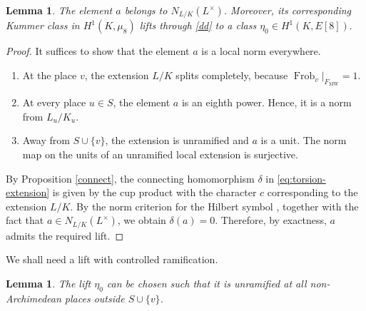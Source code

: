 \documentclass[11pt,a4paper]{amsart}
\newtheorem{lemma}[theorem]{Lemma}
\theoremstyle{definition}
\numberwithin{equation}{section}
\begin{document}
\begin{lemma}\label{lem:a-norm}
The element $a$ belongs to $N_{L/K}(L^\times)$.  Moreover, its corresponding Kummer
class in $H^1(K,\mu_8)$ lifts through \eqref{dd} to a
class
$
 \eta_0\in H^1(K,E[8]).
$
\end{lemma}

\begin{proof}
It suffices to show that the element $a$ is a local norm everywhere.
\begin{enumerate}
	\item At the place $v$, the extension $L/K$ splits completely,
	because
$
	\operatorname{Frob}_{v}|_{F_{\mathrm{MW}}}=1.
$
	
	\item At every place $u\in S$, the element $a$ is an eighth power.
	Hence, it is a norm from $L_u/K_u$.
	
	\item Away from
	$S\cup\{v\}$, the extension is unramified and $a$ is a unit.
	The norm map on the units of an unramified local extension is
	surjective.
\end{enumerate}

By Proposition \ref{connect}, the connecting homomorphism $\delta$ in \eqref{eq:torsion-extension} is given by the cup product with the
character $c$ corresponding to the extension $L/K$. By the norm
criterion for the Hilbert symbol \cite[Chapter XIV, Corollary 1]{Serre}, together with the fact
that $a\in N_{L/K}(L^\times)$, we obtain $\delta(a)=0$. Therefore, by exactness, $a$ admits the required lift.
\end{proof}

We shall need a lift with controlled ramification.

\begin{lemma}\label{lem:unramified-lift}
	The lift $\eta_0$ can be chosen such that it is unramified at all  non-Archimedean  places  outside 
 $S\cup\{ v\}$.
\end{lemma}
\end{document}
